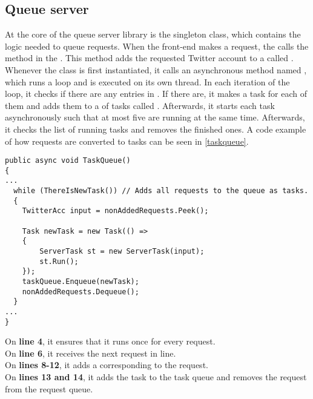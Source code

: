 \subsection{Queue server} \label{sub:queueserver}
At the core of the queue server library is the 
singleton class, which contains the logic needed to queue requests. When the
front-end makes a request, the  calls the
 method in the . This method adds the
requested Twitter account to a  called .
Whenever the  class is first instantiated, it calls
an asynchronous method named , which runs a 
loop and is executed on its own thread. In each iteration of the loop, it
checks if there are any entries in . If there are, it
makes a task for each of them and adds them to a  of tasks called
. Afterwards, it starts each task asynchronously such that at
most five are running at the same time.
Afterwards, it checks the list of running tasks and removes the finished ones. A
code example of how requests are converted to tasks can be seen in
\autoref{taskqueue}. \\

\begin{minipage}[H]{\linewidth}
\begin{lstlisting}[caption = Adding tasks to the queue., label = taskqueue] 
public async void TaskQueue()
{
...
  while (ThereIsNewTask()) // Adds all requests to the queue as tasks.
  {
	TwitterAcc input = nonAddedRequests.Peek();
	
	Task newTask = new Task(() =>
	{
	    ServerTask st = new ServerTask(input);
	    st.Run();
	});
	taskQueue.Enqueue(newTask);
	nonAddedRequests.Dequeue();
  }
...  
}

\end{lstlisting}
\end{minipage}

On \textbf{line 4}, it ensures that it runs once for every request. \\
On \textbf{line 6}, it receives the next request in line.\\
On \textbf{lines 8-12}, it adds a  corresponding to the
request.\\
On \textbf{lines 13 and 14}, it adds the task to the task queue and removes the
request from the request queue.\\

